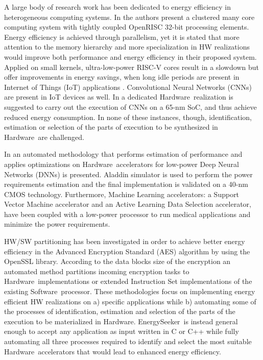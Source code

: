 \documentclass[]{usiinfthesis}
\newcommand{\eseeker}{{EnergySeeker}}
\newcommand{\HW}{{Hardware}}
\newcommand{\SW}{{Software}}
\begin{document}
A large body of research work has been dedicated to energy efficiency in heterogeneous computing
systems. In \cite{MelpignanoJune12} \cite{ContiSep16} the authors present a clustered many core 
computing system with tightly coupled OpenRISC 32-bit processing elements. Energy efficiency is 
achieved through parallelism, yet it is stated that more attention to the memory hierarchy and 
more specialization in HW realizations would improve both performance and energy efficiency in 
their proposed system. Applied on small kernels, ultra-low-power RISC-V cores result in a slowdown 
but offer improvements in energy savings, when long idle periods are present in Internet of 
Things (IoT) applications \cite{SchiavoneSep17}. Convolutional Neural Networks (CNNs) are 
present in IoT devices as well. In \cite{PulliniJan17} a dedicated \HW\ realization is 
suggested to carry out the execution of CNNs on a 65-nm SoC, and thus achieve reduced energy
consumption. In none of these instances, though, identification, estimation or selection of
the parts of execution to be synthesized in \HW\ are challenged.\par

In \cite{ReagenJun16} an automated methodology that performs estimation of performance and 
applies optimizations on \HW\ accelerators for low-power Deep Neural Networks (DNNs) is presented. 
Aladdin simulator \cite{ShaoJul14} is used to perform the power requirements estimation and the 
final implementation is validated on a 40-nm CMOS technology. Furthermore, Machine Learning 
accelerators: a Support Vector Machine accelerator and an Active Learning Data Selection 
accelerator, have been coupled with a low-power processor \cite{LeeApr13} to run medical
applications and minimize the power requirements.\par

HW/SW partitioning has been investigated \cite{XiaoMay18} in order to achieve better 
energy efficiency in the Advanced Encryption Standard (AES) algorithm by using the OpenSSL 
\cite{OpensslDec98} library. According to the data blocks size of the encryption an automated 
method partitions incoming encryption tasks to \HW\ implementations or extended Instruction Set 
implementations of the existing \SW\ processor. These methodologies focus on implementing 
energy efficient HW realizations on a) specific applications while b) automating some of the 
processes of identification, estimation and selection of the parts of the execution to be 
materialized in \HW. \eseeker\ is instead general enough to accept any application as 
input written in C or C++ while fully automating all three processes required to identify and 
select the most suitable \HW\ accelerators that would lead to enhanced energy efficiency.\par
\end{document}
